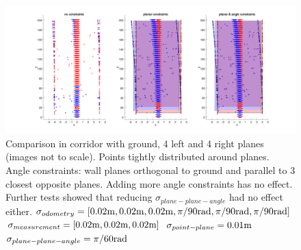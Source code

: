 \documentclass[a4paper,11pt]{article}
\begin{document}
\begin{figure}
\centering
\includegraphics[width=1.15\textwidth,trim={3cm 0 0 0},clip]{connectedSegmentedCorridorLowNoise.png}
\caption{\label{fig:connectedSegmentedCorridorLowNoise} Comparison in corridor with ground, 4 left and 4 right planes (images not to scale). Points tightly distributed around planes. Angle constraints: wall planes orthogonal to ground and parallel to 3 closest opposite planes. Adding more angle constraints has no effect. Further tests showed that reducing $\sigma_{plane-plane-angle}$ had no effect either.\newline
$\sigma_{odometry} = [0.02\textnormal{m},0.02\textnormal{m},0.02\textnormal{m},
\pi/90\textnormal{rad},\pi/90\textnormal{rad},\pi/90\textnormal{rad}]$\newline
$\sigma_{measurement} = [0.02\textnormal{m},0.02\textnormal{m},0.02\textnormal{m}]$\newline
$\sigma_{point-plane} = 0.01\textnormal{m}$\newline
$\sigma_{plane-plane-angle} = \pi/60\textnormal{rad}$}
\end{figure}
\end{document}
